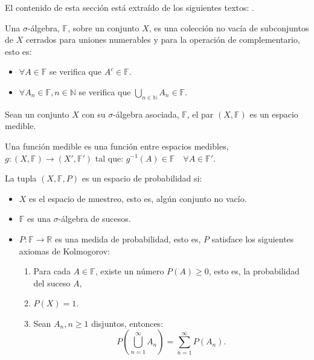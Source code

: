 \documentclass[../proyecto.tex]{memoir}
\begin{document}
El contenido de esta sección está extraído de los siguientes textos: \cite{elLibro, grandesNumeros, loeve}. 

\begin{defi}
Una $\sigma$-álgebra, $\mathds{F}$, sobre un conjunto $X$, es una colección no vacía de subconjuntos de $X$ cerrados para uniones numerables y para la operación de complementario, esto es:
\begin{itemize}
\item $\forall A \in \mathds{F}$ se verifica que $A^{c} \in \mathds{F}$.
\item $ \forall A_{n} \in \mathds{F}, n \in \mathds{N} $ se verifica que $\bigcup _{n \in \mathds{N}} A_{n} \in \mathds{F}$.
\end{itemize}
\end{defi}

\begin{defi}
Sean un conjunto $X$ con su $\sigma$-álgebra asociada, $\mathds{F}$, el par $(X, \mathds{F})$ es un espacio medible. 
\end{defi}

\begin{defi}
Una función medible es una función entre espacios medibles, $g: (X, \mathds{F}) \rightarrow (X', \mathds{F}')$ tal que: $g^{-1}(A) \in \mathds{F} \quad \forall A \in \mathds{F}'$.
\end{defi}

\begin{defi}
La tupla $(X, \mathds{F}, P)$ es un espacio de probabilidad si:
\begin{itemize}
\item $X$ es el espacio de muestreo, esto es, algún conjunto no vacío.
\item $\mathds{F}$ es una $\sigma$-álgebra de sucesos.
\item $P: \mathds{F} \to \mathds{R}$ es una medida de probabilidad, 
esto es, $P$ satisface los siguientes axiomas de Kolmogorov:
\begin{enumerate}
\item Para cada $A\in\mathds{F}$, existe un número $P(A) \geq 0$, esto es, la probabilidad del suceso $A$,
\item $P(X)=1$.
\item Sean ${A_n, n \geq 1}$ disjuntos, entonces: $$
	P \left( \bigcup_{n=1}^{\infty} A_{n} \right) = \sum_{n=1}^{\infty} P(A_n).
$$
\end{enumerate}
\end{itemize}
\end{defi}
\end{document}
